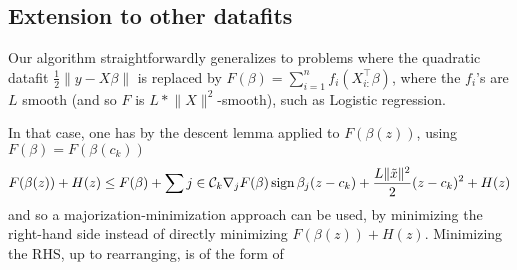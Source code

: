 \subsection{Extension to other datafits}
Our algorithm straightforwardly generalizes to problems where the quadratic datafit $\frac{1}{2} \lVert y - X \beta \rVert$ is replaced by $F(\beta) = \sum_{i = 1}^n f_i (X_{i:}^\top \beta)$, where the $f_i$'s are $L$ smooth (and so $F$ is $L * \lVert X \rVert^2$-smooth), such as Logistic regression.

In that case, one has by the descent lemma applied to $F(\beta(z))$, using $F(\beta) = F(\beta(c_k))$
\begin{equation}
  F(\beta(z)) + H(z) \leq F(\beta) + \sum{j \in \mathcal{C}_k} \nabla_j F(\beta) \operatorname{sign} \beta_j (z - c_k) + \frac{L \lVert \tilde x \rVert^2}{2} (z - c_k)^2 + H(z)
\end{equation}
and so a majorization-minimization approach can be used, by minimizing the right-hand side instead of directly minimizing $F(\beta(z)) + H(z)$.
Minimizing the RHS, up to rearranging, is of the form of 